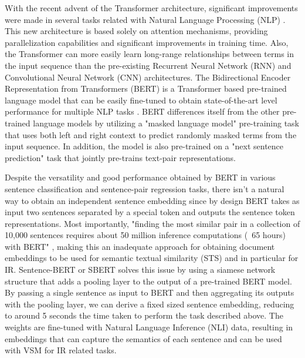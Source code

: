 \documentclass[a4paper]{article}
\begin{document}
With the recent advent of the Transformer architecture, significant improvements were made in several tasks related with Natural Language Processing (NLP) \citet{vaswani2017}. This new architecture is based solely on attention mechanisms, providing parallelization capabilities and significant improvements in training time. Also, the Transformer can more easily learn long-range relationships between terms in the input sequence than the pre-existing Recurrent Neural Network (RNN) \citep{} and Convolutional Neural Network (CNN) \citep{} architectures. The Bidirectional Encoder Representation from Transformers (BERT) is a Transformer based pre-trained language model that can be easily fine-tuned to obtain state-of-the-art level performance for multiple NLP tasks \citep{devlin2019}. BERT differences itself from the other pre-trained language models by utilizing a "masked language model" pre-training task that uses both left and right context to predict randomly masked terms from the input sequence. In addition, the model is also pre-trained on a "next sentence prediction" task that jointly pre-trains text-pair representations.

Despite the versatility and good performance obtained by BERT in various sentence classification and sentence-pair regression tasks, there isn't a natural way to obtain an independent sentence embedding since by design BERT takes as input two sentences separated by a special token and outputs the sentence token representations. Most importantly, "finding the most similar pair in a collection of 10,000 sentences requires about 50 million inference computations (~65 hours) with BERT" \citep{reimers2019}, making this an inadequate approach for obtaining document embeddings to be used for semantic textual similarity (STS) and in particular for IR. Sentence-BERT or SBERT \citep{reimers2019} solves this issue by using a siamese network structure that adds a pooling layer to the output of a pre-trained BERT model. By passing a single sentence as input to BERT and then aggregating its outputs with the pooling layer, we can derive a fixed sized sentence embedding, reducing to around 5 seconds the time taken to perform the task described above. The weights are fine-tuned with Natural Language Inference (NLI) data, resulting in embeddings that can capture the semantics of each sentence and can be used with VSM for IR related tasks.

\end{document}
